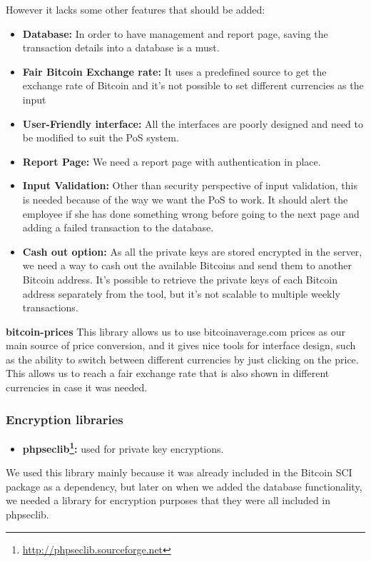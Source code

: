However it lacks some other features that should be added:
\begin{itemize}

\item \textbf{Database: } In order to have management and report page, saving the transaction details into a database is a must.
\item \textbf{Fair Bitcoin Exchange rate: } It uses a predefined source to get the exchange rate of Bitcoin and it's not possible to set different currencies as the input
\item \textbf{User-Friendly interface: } All the interfaces are poorly designed and need to be modified to suit the PoS system.
\item \textbf {Report Page: } We need a report page with authentication in place.
\item \textbf {Input Validation: } Other than security perspective of input validation, this is needed because of the way we want the PoS to work. It should alert the employee if she has done something wrong before going to the next page and adding a failed transaction to the database.
\item \textbf {Cash out option: } As all the private keys are stored encrypted in the server, we need a way to cash out the available Bitcoins and send them to another Bitcoin address. It's possible to retrieve the private keys of each Bitcoin address separately from the tool, but it's not scalable to multiple weekly transactions.
\end{itemize}

\textbf{bitcoin-prices} This library allows us to use bitcoinaverage.com prices as our main source of price conversion, and it gives nice tools for interface design, such as the ability to switch between different currencies by just clicking on the price. This allows us to reach a fair exchange rate that is also shown in different currencies in case it was needed.

\subsubsection{Encryption libraries}
\begin{itemize}
\item \textbf{phpseclib\footnote{\url{http://phpseclib.sourceforge.net}}: } used for private key encryptions.
\end{itemize}

We used this library mainly because it was already included in the Bitcoin SCI package as a dependency, but later on when we added the database functionality, we needed a library for encryption purposes that they were all included in phpseclib.

